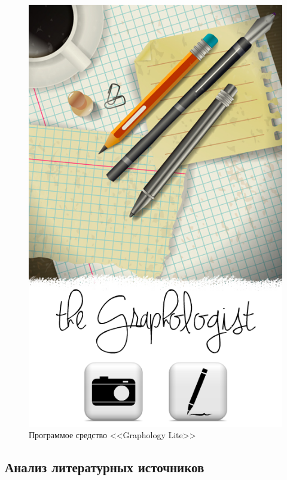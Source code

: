 \begin{figure}[ht]
    \centering
    \label{fig:domain:analogs:graphology_lite}
    \includegraphics[height=0.5\textheight]{figures/analog_graphology_lite.png}
    \caption{Программое средство <<Graphology Lite>>}
\end{figure}

\subsection{Анализ литературных источников}
\label{sub:domain:literary_sources}

